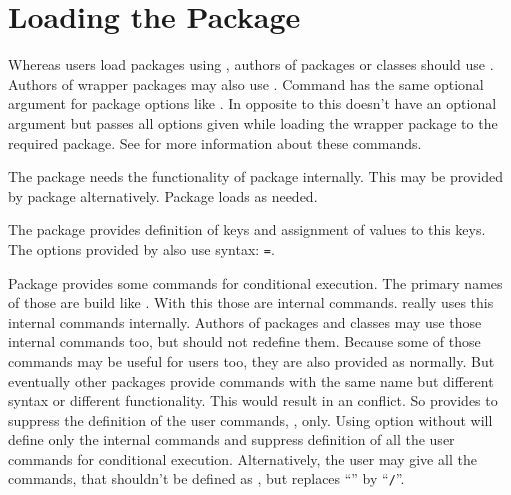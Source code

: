 \section{Loading the Package}
\label{sec:scrbase.loadit}

Whereas users load packages using , authors of packages or
classes should use . Authors of
wrapper packages may also use . Command
 has the same optional argument for package options like
. In opposite to this 
doesn't have an optional argument but passes all options given while loading
the wrapper package to the required package. See \cite{latex:clsguide} for
more information about these commands.

The package  needs the functionality of package
 internally. This may be provided by
package  alternatively. Package  loads
 as needed.

The package  provides definition of keys and assignment of
values to this keys. The options provided by  also use
 syntax: \texttt{=}.

\begin{Declaration}
\end{Declaration}
%
Package  provides some commands for conditional
execution. The primary names of those are build like
. With this those are internal commands. \KOMAScript{}
really uses this internal commands internally. Authors of packages and classes
may use those internal commands too, but should not redefine them. Because
some of those commands may be useful for users too, they are also provided as
 normally. But eventually other packages provide commands
with the same name but different syntax or different functionality. This would
result in an conflict. So  provides to suppress the
definition of the user commands, , only. Using option
 without  will define only the internal
commands and suppress definition of all the user commands for conditional
execution. Alternatively, the user may give all the commands, that shouldn't
be defined as , but replaces ``\Macro{}'' by ``\texttt{/}''.

